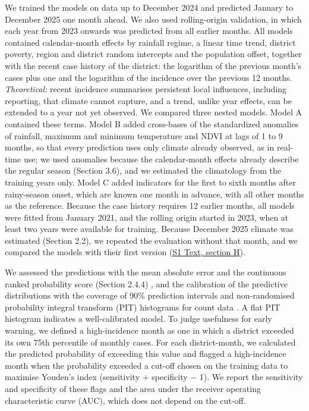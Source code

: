 \documentclass[11pt,a4paper]{article}
\begin{document}
We trained the models on data up to December 2024 and predicted January to December 2025 one month ahead. We also used rolling-origin validation, in which each year from 2023 onwards was predicted from all earlier months. All models contained calendar-month effects by rainfall regime, a linear time trend, district poverty, region and district random intercepts and the population offset, together with the recent case history of the district: the logarithm of the previous month's cases plus one and the logarithm of the incidence over the previous 12 months. \emph{Theoretical:} recent incidence summarises persistent local influences, including reporting, that climate cannot capture, and a trend, unlike year effects, can be extended to a year not yet observed. We compared three nested models. Model A contained these terms. Model B added cross-bases of the standardized anomalies of rainfall, maximum and minimum temperature and NDVI at lags of 1 to 9 months, so that every prediction uses only climate already observed, as in real-time use; we used anomalies because the calendar-month effects already describe the regular season (Section 3.6), and we estimated the climatology from the training years only. Model C added indicators for the first to sixth months after rainy-season onset, which are known one month in advance, with all other months as the reference. Because the case history requires 12 earlier months, all models were fitted from January 2021, and the rolling origin started in 2023, when at least two years were available for training. Because December 2025 climate was estimated (Section 2.2), we repeated the evaluation without that month, and we compared the models with their first version (\hyperref[s1text-h]{S1 Text, section H}).

We assessed the predictions with the mean absolute error and the continuous ranked probability score (Section 2.4.4) \cite{ref38}, and the calibration of the predictive distributions with the coverage of 90\% prediction intervals and non-randomised probability integral transform (PIT) histograms for count data \cite{ref47}. A flat PIT histogram indicates a well-calibrated model. To judge usefulness for early warning, we defined a high-incidence month as one in which a district exceeded its own 75th percentile of monthly cases. For each district-month, we calculated the predicted probability of exceeding this value and flagged a high-incidence month when the probability exceeded a cut-off chosen on the training data to maximise Youden's index (sensitivity + specificity − 1). We report the sensitivity and specificity of these flags and the area under the receiver operating characteristic curve (AUC), which does not depend on the cut-off.
\end{document}
